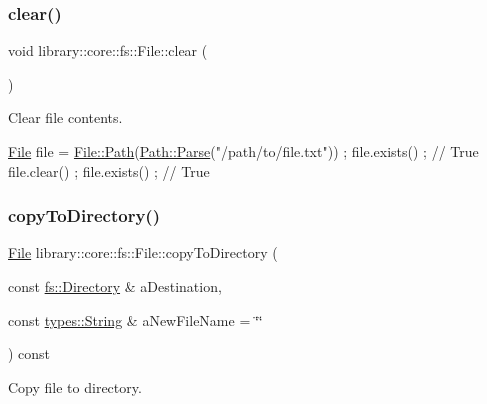 \subsubsection{\texorpdfstring{clear()}{clear()}}
{\footnotesize\ttfamily void library\+::core\+::fs\+::\+File\+::clear (\begin{DoxyParamCaption}{ }\end{DoxyParamCaption})}



Clear file contents. 


\begin{DoxyCode}
\hyperlink{classlibrary_1_1core_1_1fs_1_1File_a7490060f19a21d4ee58bb6cec87a1ca6}{File} file = \hyperlink{classlibrary_1_1core_1_1fs_1_1File_a0e0d8a8becb3cdd21775554e181452d8}{File::Path}(\hyperlink{classlibrary_1_1core_1_1fs_1_1Path_aebf5bd3af83e0b7376616e146f3e55df}{Path::Parse}(\textcolor{stringliteral}{"/path/to/file.txt"})) ;
file.exists() ; \textcolor{comment}{// True}
file.clear() ;
file.exists() ; \textcolor{comment}{// True}
\end{DoxyCode}
 \mbox{\label{classlibrary_1_1core_1_1fs_1_1File_a97b8b2deee991e5eefb78e811806788d}} 
\subsubsection{\texorpdfstring{copy\+To\+Directory()}{copyToDirectory()}}
{\footnotesize\ttfamily \hyperlink{classlibrary_1_1core_1_1fs_1_1File}{File} library\+::core\+::fs\+::\+File\+::copy\+To\+Directory (\begin{DoxyParamCaption}\item[{const \hyperlink{classlibrary_1_1core_1_1fs_1_1Directory}{fs\+::\+Directory} \&}]{a\+Destination,  }\item[{const \hyperlink{classlibrary_1_1core_1_1types_1_1String}{types\+::\+String} \&}]{a\+New\+File\+Name = {\ttfamily \char`\"{}\char`\"{}} }\end{DoxyParamCaption}) const}



Copy file to directory. 


